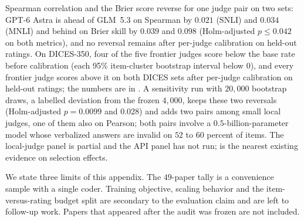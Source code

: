 \begin{enumerate}
Spearman correlation and the Brier score reverse for one judge pair on two sets: GPT-6 Astra is ahead of GLM~5.3 on Spearman by $0.021$ (SNLI) and $0.034$ (MNLI) and behind on Brier skill by $0.039$ and $0.098$ (Holm-adjusted $p\le0.042$ on both metrics), and no reversal remains after per-judge calibration on held-out ratings.
On DICES-350, four of the five frontier judges score below the base rate before calibration (each 95\% item-cluster bootstrap interval below $0$), and every frontier judge scores above it on both DICES sets after per-judge calibration on held-out ratings; the numbers are in .
A sensitivity run with $20{,}000$ bootstrap draws, a labelled deviation from the frozen $4{,}000$, keeps these two reversals (Holm-adjusted $p=0.0099$ and $0.028$) and adds two pairs among small local judges, one of them also on Pearson; both pairs involve a $0.5$-billion-parameter model whose verbalized answers are invalid on $52$ to $60$ percent of items.
The local-judge panel is partial and the API panel has not run; \citet{guerdan2025validating} is the nearest existing evidence on selection effects.
\end{enumerate}
We state three limits of this appendix.
The $49$-paper tally is a convenience sample with a single coder.
Training objective, scaling behavior and the item-versus-rating budget split are secondary to the evaluation claim and are left to follow-up work.
Papers that appeared after the audit was frozen are not included.
